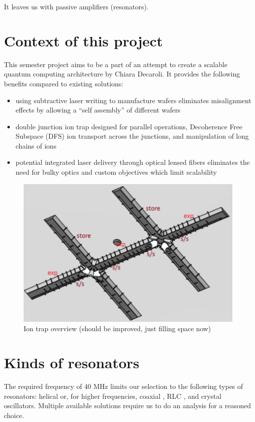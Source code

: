 It leaves us with passive amplifiers (resonators).
\section{Context of this project}
\label{sec:context}
This semester project aims to be a part of an attempt to create a scalable quantum computing architecture by Chiara Decaroli. It provides the following benefits compared to existing solutions:
\begin{itemize}
	\item using subtractive laser writing to manufacture wafers eliminates misalignment effects by allowing a ``self assembly'' of different wafers
	\item double junction ion trap designed for parallel operations, Decoherence Free Subspace (DFS) ion transport across the junctions, and manipulation of long chains of ions
	\item potential integrated laser delivery through optical lensed fibers eliminates the need for bulky optics and custom objectives which limit scalability
\end{itemize}

\begin{figure}[h]
	\centering
	\includegraphics[width=.99\textwidth]{images/trap}
	\caption{Ion trap overview (should be improved, just filling space now)}
\end{figure}

\section{Kinds of resonators}
\label{sec:kinds_resonators}
The required frequency of 40 MHz limits our selection to the following types of resonators: helical \cite{Gulde2017, Johnson2016, VanRynbach2016, Kassa2016, Kassa2017} or, for higher frequencies, coaxial \cite{Karin2012}, RLC \cite{Gandolfi2010, Kumph2015, Greene2016}, and crystal oscillators. Multiple available solutions require us to do an analysis for a reasoned choice.

